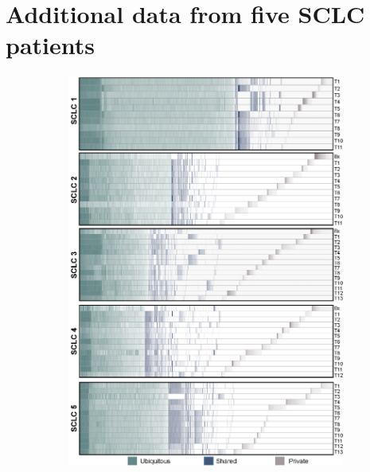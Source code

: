 \chapter{Additional data from five SCLC patients}
\label{app.sclc}

\begin{figure}[p]
    \centering
    \begin{subfigure}{0.6\textwidth}
        \includegraphics[width=\linewidth,keepaspectratio]{images/sclc/mutation_heatmap}
        \caption{}\label{fig:sclc:mutation_heatmaps}
    \end{subfigure}
    

\end{figure}
